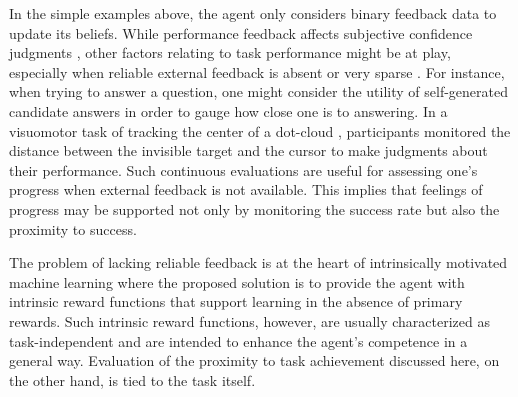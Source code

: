 In the simple examples above, the agent only considers binary feedback data to update its beliefs. While performance feedback affects subjective confidence judgments \cite{marti_certainty_2018,rouault_forming_2019}, other factors relating to task performance might be at play, especially when reliable external feedback is absent or very sparse \cite[e.g.,][]{rouault_forming_2019,holm_episodic_2019,locke_performance_2020}. For instance, when trying to answer a question, one might consider the utility of self-generated candidate answers \cite{coenen_asking_2019} in order to gauge how close one is to answering. In a visuomotor task of tracking the center of a dot-cloud \cite{locke_performance_2020}, participants monitored the distance between the invisible target and the cursor to make judgments about their performance. Such continuous evaluations are useful for assessing one's progress when external feedback is not available. This implies that feelings of progress may be supported not only by monitoring the success rate but also the proximity to success.

The problem of lacking reliable feedback is at the heart of intrinsically motivated machine learning \cite{oudeyer_computational_2018,linke_adapting_2020} where the proposed solution is to provide the agent with intrinsic reward functions that support learning in the absence of primary rewards. Such intrinsic reward functions, however, are usually characterized as task-independent and are intended to enhance the agent's competence in a general way. Evaluation of the proximity to task achievement discussed here, on the other hand, is tied to the task itself.

